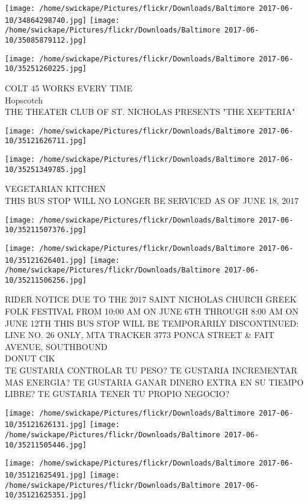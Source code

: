 \documentclass[10pt,letterpaper]{article}
\begin{document}
\texttt{[image: /home/swickape/Pictures/flickr/Downloads/Baltimore 2017-06-10/34864298740.jpg]}
\texttt{[image: /home/swickape/Pictures/flickr/Downloads/Baltimore 2017-06-10/35085879112.jpg]}

\texttt{[image: /home/swickape/Pictures/flickr/Downloads/Baltimore 2017-06-10/35251260225.jpg]}

COLT 45 WORKS EVERY TIME\\
Hopscotch\\
THE THEATER CLUB OF ST. NICHOLAS PRESENTS "THE XEFTERIA"
\pagebreak

\texttt{[image: /home/swickape/Pictures/flickr/Downloads/Baltimore 2017-06-10/35121626711.jpg]}

\vspace{0.25in}
\texttt{[image: /home/swickape/Pictures/flickr/Downloads/Baltimore 2017-06-10/35251349785.jpg]}

VEGETARIAN KITCHEN\\
THIS BUS STOP WILL NO LONGER BE SERVICED AS OF JUNE 18, 2017
\pagebreak

\texttt{[image: /home/swickape/Pictures/flickr/Downloads/Baltimore 2017-06-10/35211507376.jpg]}

\vspace{0.25in}
\texttt{[image: /home/swickape/Pictures/flickr/Downloads/Baltimore 2017-06-10/35121626401.jpg]}
\texttt{[image: /home/swickape/Pictures/flickr/Downloads/Baltimore 2017-06-10/35211506256.jpg]}

RIDER NOTICE DUE TO THE 2017 SAINT NICHOLAS CHURCH GREEK FOLK FESTIVAL FROM 10:00 AM ON JUNE 6TH THROUGH 8:00 AM ON JUNE 12TH THIS BUS STOP WILL BE TEMPORARILY DISCONTINUED: LINE NO. 26 ONLY, MTA TRACKER 3773 PONCA STREET \& FAIT AVENUE, SOUTHBOUND\\
DONUT CIK\\
TE GUSTARIA CONTROLAR TU PESO?  TE GUSTARIA INCREMENTAR MAS ENERGIA?  TE GUSTARIA GANAR DINERO EXTRA EN SU TIEMPO LIBRE?  TE GUSTARIA TENER TU PROPIO NEGOCIO?
\pagebreak

\texttt{[image: /home/swickape/Pictures/flickr/Downloads/Baltimore 2017-06-10/35121626131.jpg]}
\texttt{[image: /home/swickape/Pictures/flickr/Downloads/Baltimore 2017-06-10/35211505446.jpg]}

\texttt{[image: /home/swickape/Pictures/flickr/Downloads/Baltimore 2017-06-10/35121625491.jpg]}
\texttt{[image: /home/swickape/Pictures/flickr/Downloads/Baltimore 2017-06-10/35121625351.jpg]}
\end{document}
